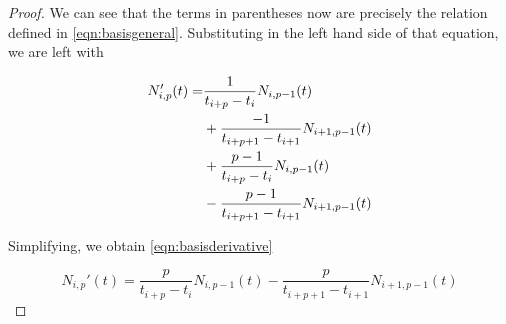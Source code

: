 \begin{appendices}
\begin{proof}
We can see that the terms in parentheses now are precisely the relation defined in \cref{eqn:basisgeneral}. Substituting in the left hand side of that equation, we are left with

\begin{equation}
\begin{split}
N_{i,p}'(t) =& \frac{1}{t_{i+p} - t_i} N_{i,p-1}(t)\\
& + \frac{-1}{t_{i+p+1} - t_{i+1}} N_{i+1,p-1}(t) \\ 
& + \frac{p-1}{t_{i+p} - t_i} N_{i,p-1}(t) \\
& - \frac{p-1}{t_{i+p+1} - t_{i+1}} N_{i+1,p-1}(t)
\end{split}\raisetag{3\baselineskip}
\end{equation}

Simplifying, we obtain \cref{eqn:basisderivative}

\[
N_{i,p}'(t) = \frac{p}{t_{i+p} - t_i} N_{i,p-1}(t) - \frac{p}{t_{i+p+1} - t_{i+1}} N_{i+1,p-1}(t)
\]

\end{proof}

\end{appendices}

